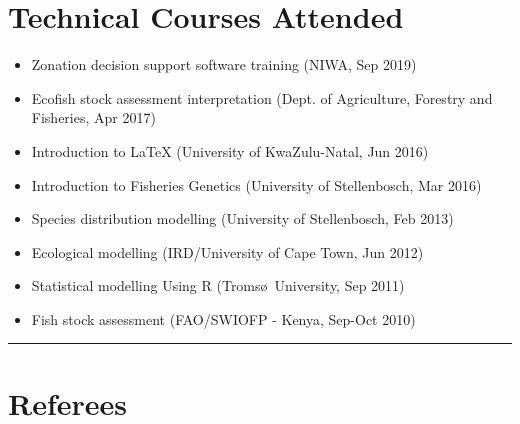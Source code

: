 \documentclass[10pt,a4paper]{article}
\begin{document}
\section*{Technical Courses Attended}
	\begin{itemize}[itemsep=2pt, parsep=0pt]
		\setlength\itemsep{0.05em}
		\item Zonation decision support software training (NIWA, Sep 2019)
		\item Ecofish stock assessment interpretation (Dept. of Agriculture, Forestry and Fisheries, Apr 2017)
		\item Introduction to \LaTeX{} (University of KwaZulu-Natal, Jun 2016)
		\item Introduction to Fisheries Genetics (University of Stellenbosch, Mar 2016)
		\item Species distribution modelling (University of Stellenbosch, Feb 2013) 
		\item Ecological modelling (IRD/University of Cape Town, Jun 2012)
		\item Statistical modelling Using R (Troms\o\ University, Sep 2011)
		\item Fish stock assessment (FAO/SWIOFP - Kenya, Sep-Oct 2010)
	\end{itemize}
\hrule
\vspace{6pt}
\noindent
\noindent
\section*{Referees}
\end{document}
